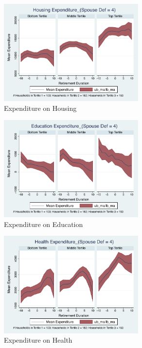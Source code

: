 \documentclass[11pt,onecolumn]{article}
\numberwithin{figure}{section}
\begin{document}
\clearpage

\begin{figure}[h]
	\caption{Expenditure on Housing}
	\centering
	\includegraphics[width=0.65\textwidth]{../ConsumptionPostRetirement_by_SpouseDef_Cats/Smoothed/4/spouse_def_total_housing_real.pdf}
\end{figure}


\begin{figure}[h]
	\caption{Expenditure on Education}
	\centering
	\includegraphics[width=0.65\textwidth]{../ConsumptionPostRetirement_by_SpouseDef_Cats/Smoothed/4/spouse_def_total_education_real.pdf}
\end{figure}
\clearpage

\begin{figure}[h]
	\caption{Expenditure on Health}
	\centering
	\includegraphics[width=0.65\textwidth]{../ConsumptionPostRetirement_by_SpouseDef_Cats/Smoothed/4/spouse_def_total_healthexpense_real.pdf}
\end{figure}
\end{document}
